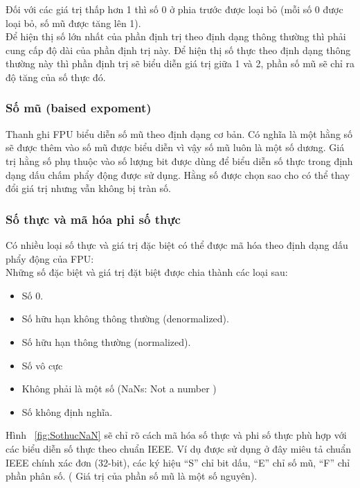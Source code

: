 		Đối với các giá trị thấp hơn 1 thì số 0 ở phia trước được loại bỏ (mỗi số 0 được loại bỏ, số mũ được tăng lên 1).\\

		Để hiện thị số lớn nhất của phần định trị theo định dạng thông thường thì phải cung cấp độ dài của phần định trị này. Để hiện thị số thực theo định dạng thông thường này thì phần định trị sẽ biểu diễn giá trị giữa 1 và 2, phần số mũ sẽ chỉ ra độ tăng của số thực đó.
		
		\subsubsection*{Số mũ (baised expoment)}
			Thanh ghi FPU biểu diễn số mũ theo định dạng cơ bản. Có nghĩa là một hằng số sẽ được thêm vào số mũ được biểu diễn vì vậy số mũ luôn là một số dương. Giá trị hằng số phụ thuộc vào số lượng bit được dùng để biểu diễn số thực trong định dạng dấu chấm phẩy động được sử dụng. Hằng số được chọn sao cho có thể thay đổi giá trị nhưng vẫn không bị tràn số.
			
			\newpage
			\subsubsection*{Số thực và mã hóa phi số thực}
			Có nhiều loại số thực và giá trị đặc biệt có thể được mã hóa theo định dạng dấu phẩy động của FPU:\\
			
			Những số đặc biệt và giá trị đặt biệt được chia thành các loại sau:
			\begin{itemize}
				\renewcommand{\labelitemi}{\textbullet}	
				\item Số 0.
				\item	Số hữu hạn không thông thường (denormalized).
				\item	Số hữu hạn thông thường (normalized).
				\item	Số vô cực
				\item	Không phải là một số (NaNs: Not a number )
				\item	Số không định nghĩa.
			\end{itemize}
			
			Hình ~\ref{fig:SothucNaN} sẽ chỉ rõ cách mã hóa số thực và phi số thực phù hợp với các biểu diễn số thực theo chuẩn IEEE. Ví dụ được sử dụng ở đây miêu tả chuẩn IEEE chính xác đơn (32-bit), các ký hiệu “S” chỉ bit dấu, “E” chỉ số mũ, “F” chỉ phần phân số. ( Giá trị của phần số mũ là một số nguyên). \\

